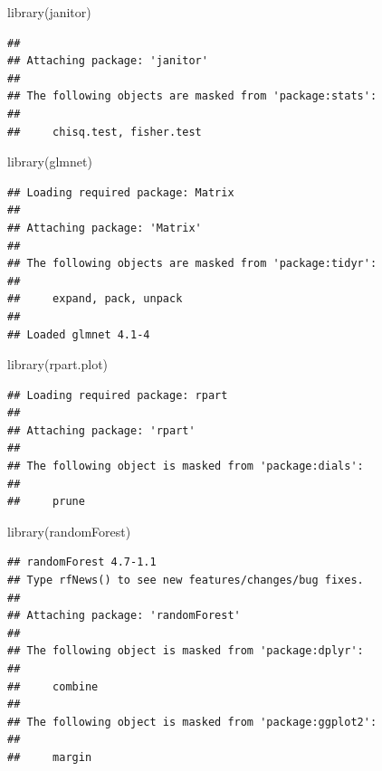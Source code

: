 \documentclass[
]{article}
\newenvironment{Shaded}{\begin{snugshade}}{\end{snugshade}}
\newcommand{\FunctionTok}[1]{\textcolor[rgb]{0.00,0.00,0.00}{#1}}
\newcommand{\NormalTok}[1]{#1}
\begin{document}
\begin{Shaded}
\begin{Highlighting}[]
\FunctionTok{library}\NormalTok{(janitor)}
\end{Highlighting}
\end{Shaded}

\begin{verbatim}
## 
## Attaching package: 'janitor'
## 
## The following objects are masked from 'package:stats':
## 
##     chisq.test, fisher.test
\end{verbatim}

\begin{Shaded}
\begin{Highlighting}[]
\FunctionTok{library}\NormalTok{(glmnet)}
\end{Highlighting}
\end{Shaded}

\begin{verbatim}
## Loading required package: Matrix
## 
## Attaching package: 'Matrix'
## 
## The following objects are masked from 'package:tidyr':
## 
##     expand, pack, unpack
## 
## Loaded glmnet 4.1-4
\end{verbatim}

\begin{Shaded}
\begin{Highlighting}[]
\FunctionTok{library}\NormalTok{(rpart.plot)}
\end{Highlighting}
\end{Shaded}

\begin{verbatim}
## Loading required package: rpart
## 
## Attaching package: 'rpart'
## 
## The following object is masked from 'package:dials':
## 
##     prune
\end{verbatim}

\begin{Shaded}
\begin{Highlighting}[]
\FunctionTok{library}\NormalTok{(randomForest)}
\end{Highlighting}
\end{Shaded}

\begin{verbatim}
## randomForest 4.7-1.1
## Type rfNews() to see new features/changes/bug fixes.
## 
## Attaching package: 'randomForest'
## 
## The following object is masked from 'package:dplyr':
## 
##     combine
## 
## The following object is masked from 'package:ggplot2':
## 
##     margin
\end{verbatim}
\end{document}
